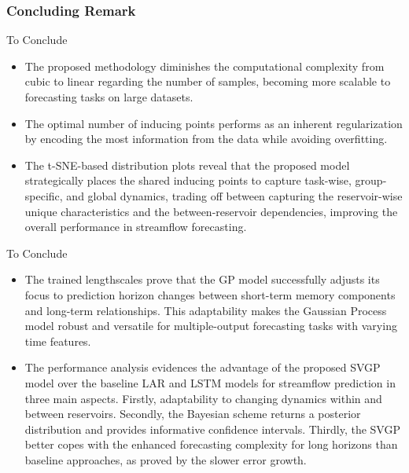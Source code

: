 \subsubsection{Concluding Remark}
\begin{frame}{To Conclude}
	\begin{itemize}
		\justifying
		\item The proposed methodology diminishes the computational complexity from cubic to linear regarding the number of samples, becoming more scalable to forecasting tasks on large datasets.
		\item The optimal number of inducing points performs as an inherent regularization by encoding the most information from the data while avoiding overfitting.
		\item The t-SNE-based distribution plots reveal that the proposed model strategically places the shared inducing points to capture task-wise, group-specific, and global dynamics, trading off between capturing the reservoir-wise unique characteristics and the between-reservoir dependencies, improving the overall performance in streamflow forecasting.
	\end{itemize}
	
\end{frame}

\begin{frame}{To Conclude}
	\begin{itemize}
		\justifying
		\item The trained lengthscales prove that the GP model successfully adjusts its focus to prediction horizon changes between short-term memory components and long-term relationships. This adaptability makes the Gaussian Process model robust and versatile for multiple-output forecasting tasks with varying time features.
		
		\item The performance analysis evidences the advantage of the proposed SVGP model over the baseline LAR and LSTM models for streamflow prediction in three main aspects. Firstly, adaptability to changing dynamics within and between reservoirs. Secondly, the Bayesian scheme returns a posterior distribution and provides informative confidence intervals. Thirdly, the SVGP better copes with the enhanced forecasting complexity for long horizons than baseline approaches, as proved by the slower error growth.
		
	\end{itemize}
	
\end{frame}
